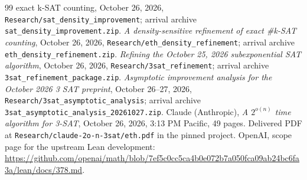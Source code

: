 \documentclass[11pt,letterpaper]{article}
\theoremstyle{remark}\newtheorem{remark}[theorem]{Remark}
\newcommand{\sourceurl}[1]{\url{#1}}
\begin{document}
\begin{thebibliography}{99}
{exact k-SAT counting}, October 26, 2026,
\texttt{Research/sat\_density\_improvement}; arrival archive
\texttt{sat\_density\_improvement.zip}.
 \emph{A density-sensitive refinement of exact
\#k-SAT counting}, October 26, 2026,
\texttt{Research/eth\_density\_refinement}; arrival archive
\texttt{eth\_density\_refinement.zip}.
 \emph{Refining the October 25, 2026 subexponential
SAT algorithm}, October 26, 2026, \texttt{Research/3sat\_refinement};
arrival archive \texttt{3sat\_refinement\_package.zip}.
 \emph{Asymptotic improvement analysis for the
October 2026 3 SAT preprint}, October 26--27, 2026,
\texttt{Research/3sat\_asymptotic\_analysis}; arrival archive
\texttt{3sat\_asymptotic\_analysis\_20261027.zip}.
 Claude (Anthropic), \emph{A $2^{o(n)}$ time algorithm
for 3-SAT}, October 26, 2026, 3:13 PM Pacific, 49 pages. Delivered PDF
at \texttt{Research/claude-2o-n-3sat/eth.pdf} in the pinned project.
 OpenAI, scope page for the upstream Lean development:
\sourceurl{https://github.com/openai/math/blob/7ef5c0cc5ca4b0e072b7a050fca09ab24bc6fa3a/lean/docs/378.md}.
\end{thebibliography}
\end{document}
